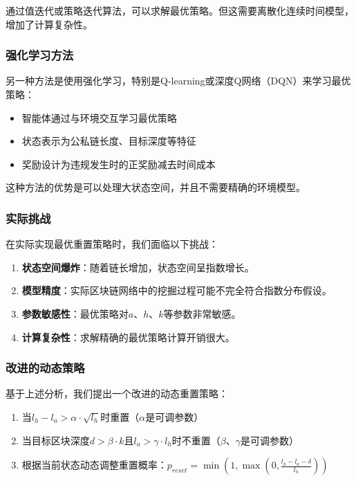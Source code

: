 \documentclass[12pt,a4paper]{article}
\begin{document}
\begin{CJK}{UTF8}{gbsn}
通过值迭代或策略迭代算法，可以求解最优策略。但这需要离散化连续时间模型，增加了计算复杂性。

\subsubsection{强化学习方法}

另一种方法是使用强化学习，特别是Q-learning或深度Q网络（DQN）来学习最优策略：

\begin{itemize}
    \item 智能体通过与环境交互学习最优策略
    \item 状态表示为公私链长度、目标深度等特征
    \item 奖励设计为违规发生时的正奖励减去时间成本
\end{itemize}

这种方法的优势是可以处理大状态空间，并且不需要精确的环境模型。

\subsubsection{实际挑战}

在实际实现最优重置策略时，我们面临以下挑战：

\begin{enumerate}
    \item \textbf{状态空间爆炸}：随着链长增加，状态空间呈指数增长。
    \item \textbf{模型精度}：实际区块链网络中的挖掘过程可能不完全符合指数分布假设。
    \item \textbf{参数敏感性}：最优策略对$a$、$h$、$k$等参数非常敏感。
    \item \textbf{计算复杂性}：求解精确的最优策略计算开销很大。
\end{enumerate}

\subsubsection{改进的动态策略}

基于上述分析，我们提出一个改进的动态重置策略：

\begin{enumerate}
    \item 当$l_h - l_a > \alpha \cdot \sqrt{l_h}$时重置（$\alpha$是可调参数）
    \item 当目标区块深度$d > \beta \cdot k$且$l_a > \gamma \cdot l_h$时不重置（$\beta$、$\gamma$是可调参数）
    \item 根据当前状态动态调整重置概率：$p_{reset} = \min(1, \max(0, \frac{l_h - l_a - \delta}{l_h}))$
\end{enumerate}


\end{CJK}
\end{document}
